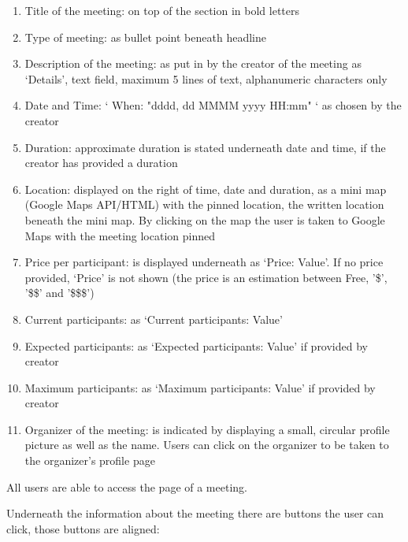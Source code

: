 \documentclass[conference]{IEEEtran}
\begin{document}
\begin{enumerate}
    \item Title of the meeting: on top of the section in bold letters
    \item Type of meeting: as bullet point beneath headline
    \item Description of the meeting: as put in by the creator of the meeting as ‘Details’, text field, maximum 5 lines of text, alphanumeric characters only
    \item Date and Time: ‘ When: "dddd, dd MMMM yyyy HH:mm" ‘ as chosen by the creator
    \item Duration: approximate duration is stated underneath date and time, if the creator has provided a duration
    \item Location: displayed on the right of time, date and duration, as a mini map (Google Maps API/HTML) with the pinned location, the written location beneath the mini map.
    By clicking on the map the user is taken to Google Maps with the meeting location pinned
    \item Price per participant: is displayed underneath as ‘Price: Value’. If no price provided, ‘Price’ is not shown (the price is an estimation between Free, '\$', '\$\$' and '\$\$\$')
    \item Current participants: as ‘Current participants: Value’
    \item Expected participants: as ‘Expected participants: Value’ if provided by creator
    \item Maximum participants: as ‘Maximum participants: Value’ if provided by creator
    \item Organizer of the meeting: is indicated by displaying a small, circular profile picture as well as the name.
    Users can click on the organizer to be taken to the organizer's profile page
\end{enumerate}

All users are able to access the page of a meeting.

Underneath the information about the meeting there are buttons the user can click, those buttons are aligned:
\end{document}
